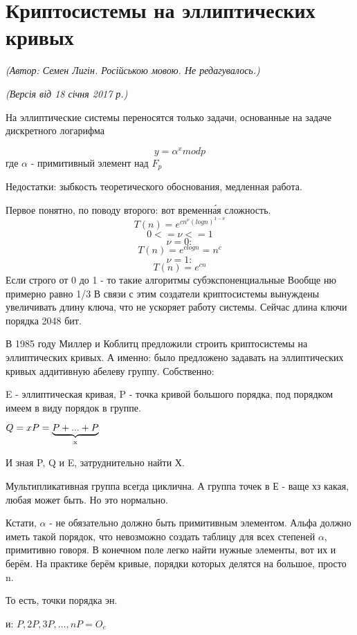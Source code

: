 \section{Криптосистемы на эллиптических кривых}
\begin{flushright}
\emph{(Автор: Семен Лигін. Російською мовою. Не редагувалось.)}
\par \emph{(Версія від 18 січня 2017 р.)}
\end{flushright}


На эллиптические системы переносятся только задачи, основанные на задаче дискретного логарифма

\begin{equation}
    y= \alpha^x mod p
\end{equation}
где $\alpha$ - примитивный элемент над $F_p$

Недостатки: зыбкость теоретического обоснования, медленная работа. 

Первое понятно, по поводу второго: вот временн\'{а}я сложность. 
    $$T(n) = e^{cn^\nu(logn)^{1-\nu}}$$
    $$0<=\nu<=1$$
    $$\nu=0:$$
    $$T(n) = e^{clogn}=n^c$$
    $$\nu = 1:$$
    $$T(n) = e^{cn}$$
Если строго от 0 до 1 - то такие алгоритмы субэкспоненциальные
Вообще ню примерно равно 1/3
В связи с этим создатели криптосистемы вынуждены увеличивать длину ключа, что не ускоряет работу системы. 
Сейчас длина ключи порядка 2048 бит. 

В 1985 году Миллер и Коблитц предложили строить криптосистемы на эллиптических кривых. А именно: было предложено задавать на эллиптических кривых аддитивную абелеву группу. Собственно:

E - эллиптическая кривая,
P - точка кривой большого порядка, под порядком имеем в виду порядок в группе.

$Q=xP=\underbrace {P+...+P}_{\text x}$

И зная P, Q и E, затруднительно найти Х.

Мультипликативная группа всегда циклична. А группа точек в Е - ваще хз какая, любая может быть. Но это нормально. 

Кстати, $\alpha$ - не обязательно должно быть примитивным элементом. Альфа должно иметь такой порядок, что невозможно создать таблицу для всех степеней $\alpha$, примитивно говоря. В конечном поле легко найти нужные элементы, вот их и берём. 
На практике берём кривые, порядки которых делятся на большое, просто n.

То есть, точки порядка эн. 

и: 
$P, 2P, 3P, ... , nP = O_e$ 

